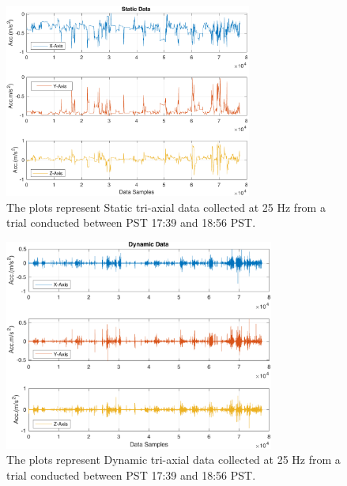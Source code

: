 \documentclass[conference]{IEEEtran}
\begin{document}
\begin{figure}[!hb]
	\centering
	\includegraphics[width=3.2in]{1_static.pdf}
	\caption{The plots represent Static tri-axial data collected at 25 Hz from a trial conducted between PST 17:39 and 18:56 PST.}
	\label{static}
\end{figure}
\begin{figure}[!hb]
	\centering
	\includegraphics[width=3.49in]{2_dynamic.pdf}
	\caption{The plots represent Dynamic tri-axial data collected at 25 Hz from a trial conducted between PST 17:39 and 18:56 PST.}
	\label{dynamic}
\end{figure}
\end{document}
